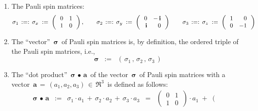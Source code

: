 \vskip 0.2cm
\begin{definition}
\mbox{}
\vskip 0.01cm
\begin{enumerate}
\item
    \vskip -0.1cm
    The Pauli spin matrices:
    \begin{equation*}
    \sigma_{1}
    \, :=: \,
        \sigma_{x}
    \; := \;
        \left(\,\begin{array}{rr}
            0 & 1
            \\
            1 & 0
            \end{array}\,\right),
    \quad\quad
    \sigma_{2}
    \, :=: \,
        \sigma_{y}
    \; := \;
        \left(\,\begin{array}{rr}
            0 & -\,\mathbf{i}
            \\
            \mathbf{i} & 0
            \end{array}\,\right)
    \quad\quad
    \sigma_{3}
    \, :=: \,
        \sigma_{z}
    \; := \;
        \left(\,\begin{array}{rr}
            1 & 0
            \\
            0 & -1
            \end{array}\,\right)
    \end{equation*}
\item
    The ``vector'' \,$\boldsymbol{\sigma}$\, of Pauli spin matrices is, by definition,
    the ordered triple of the Pauli spin matrices, i.e.,
    \begin{equation*}
    \boldsymbol{\sigma}
    \;\; := \;\;
        \left(\, \sigma_{1} \,,\, \sigma_{2} \,,\, \sigma_{3} \,\right)
    \end{equation*}
\item
    The ``dot product''
    \,$\boldsymbol{\sigma} \,\bullet\, \mathbf{a}$\,
    of the vector
    \,$\boldsymbol{\sigma}$\,
    of Pauli spin matrices with a vector
    \,$\mathbf{a} \,=\, (a_{1},a_{2},a_{3}) \,\in\, \Re^{3}$\,
    is defined as follows:
    \begin{eqnarray*}
    \boldsymbol{\sigma} \,\bullet\, \mathbf{a}
    & := &
        \sigma_{1} \cdot a_{1}
        \, + \,
        \sigma_{2} \cdot a_{2}
        \, + \,
        \sigma_{3} \cdot a_{3}
    \;\; = \;\;
        \left(\,\begin{array}{rr}
            0 & 1
            \\
            1 & 0
            \end{array}\,\right)
        \cdot
        a_{1}
        \; + \;
        \left(\,\begin{array}{rr}

\end{array}
\end{eqnarray*}
\end{enumerate}
\end{definition}
